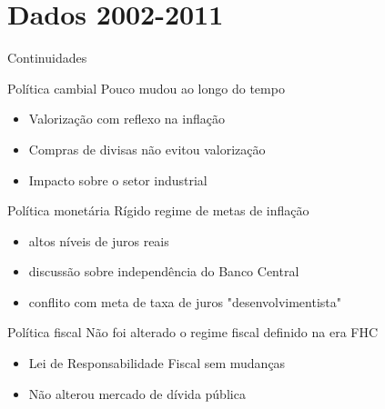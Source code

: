 \documentclass[presentation]{beamer}
\begin{document}
\section{Dados 2002-2011}
\label{sec:org8b69459}
\begin{frame}[label={sec:org4af0acd}]{Continuidades}
\begin{block}{Política cambial}
Pouco mudou ao longo do tempo

\begin{itemize}
\item Valorização com reflexo na inflação
\item Compras de divisas não evitou valorização
\item Impacto sobre o setor industrial
\end{itemize}
\end{block}

\begin{block}{Política monetária}
Rígido regime de metas de inflação

\begin{itemize}
\item altos níveis de juros reais
\item discussão sobre independência do Banco Central
\item conflito com meta de taxa de juros "desenvolvimentista"
\end{itemize}
\end{block}

\begin{block}{Política fiscal}
Não foi alterado o regime fiscal definido na era FHC

\begin{itemize}
\item Lei de Responsabilidade Fiscal sem mudanças
\item Não alterou mercado de dívida pública
\end{itemize}
\end{block}
\end{frame}
\end{document}
